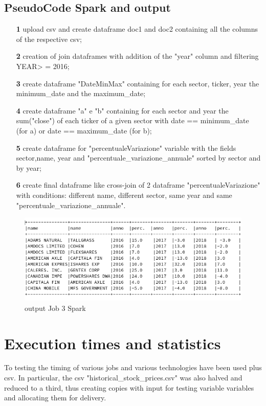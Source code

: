 \documentclass[]{report}
\begin{document}
\section*{PseudoCode Spark and output}
\begin{itemize}
	\item[\textbf{1}] upload csv and create dataframe doc1 and doc2 containing all the columns of the respective csv;
	\item[\textbf{2}] creation of join dataframes with addition of the "year" column and filtering YEAR> = 2016;
	\item[\textbf{3}] create dataframe "DateMinMax" containing for each sector, ticker, year the minimum\_date and the maximum\_date;
	\item[\textbf{4}] create dataframe "a" e "b" containing for each sector and year the sum("close") of each ticker of a given sector with date == minimum\_date (for a) or date == maximum\_date (for b);
	\item[\textbf{5}] create dataframe for "percentualeVariazione" variable with the fields sector,name, year and "percentuale\_variazione\_annuale" sorted by sector and by year;
	\item[\textbf{6}] create final dataframe like cross-join of 2 dataframe "percentualeVariazione" with conditions: different name, different sector, same year and same "percentuale\_variazione\_annuale".
\end{itemize}

\begin{center}
	\begin{figure}[!htb]
		\vspace{1 cm}
		\hspace{-1 cm}
		\includegraphics[width=1.2 \linewidth]{figure/output3spark}
		\caption{output Job 3 Spark}
	\end{figure}
\end{center}


\chapter*{Execution times and statistics}
To testing the timing of various jobs and various technologies have been used plus csv. In particular, the csv "historical\_stock\_prices.csv" was also halved and reduced to a third, thus creating copies with input for testing variable variables and allocating them for delivery.
\end{document}
